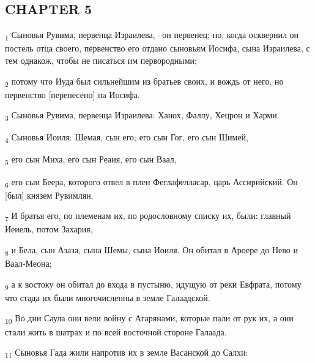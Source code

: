 \subsection{CHAPTER 5}
\begin{tcolorbox}
\textsubscript{1} Сыновья Рувима, первенца Израилева, --он первенец; но, когда осквернил он постель отца своего, первенство его отдано сыновьям Иосифа, сына Израилева, с тем однакож, чтобы не писаться им первородными;
\end{tcolorbox}
\begin{tcolorbox}
\textsubscript{2} потому что Иуда был сильнейшим из братьев своих, и вождь от него, но первенство [перенесено] на Иосифа.
\end{tcolorbox}
\begin{tcolorbox}
\textsubscript{3} Сыновья Рувима, первенца Израилева: Ханох, Фаллу, Хецрон и Харми.
\end{tcolorbox}
\begin{tcolorbox}
\textsubscript{4} Сыновья Иоиля: Шемая, сын его; его сын Гог, его сын Шимей,
\end{tcolorbox}
\begin{tcolorbox}
\textsubscript{5} его сын Миха, его сын Реаия, его сын Ваал,
\end{tcolorbox}
\begin{tcolorbox}
\textsubscript{6} его сын Беера, которого отвел в плен Феглафелласар, царь Ассирийский. Он [был] князем Рувимлян.
\end{tcolorbox}
\begin{tcolorbox}
\textsubscript{7} И братья его, по племенам их, по родословному списку их, были: главный Иеиель, потом Захария,
\end{tcolorbox}
\begin{tcolorbox}
\textsubscript{8} и Бела, сын Азаза, сына Шемы, сына Иоиля. Он обитал в Ароере до Нево и Ваал-Меона;
\end{tcolorbox}
\begin{tcolorbox}
\textsubscript{9} а к востоку он обитал до входа в пустыню, идущую от реки Евфрата, потому что стада их были многочисленны в земле Галаадской.
\end{tcolorbox}
\begin{tcolorbox}
\textsubscript{10} Во дни Саула они вели войну с Агарянами, которые пали от рук их, а они стали жить в шатрах и по всей восточной стороне Галаада.
\end{tcolorbox}
\begin{tcolorbox}
\textsubscript{11} Сыновья Гада жили напротив их в земле Васанской до Салхи:
\end{tcolorbox}
